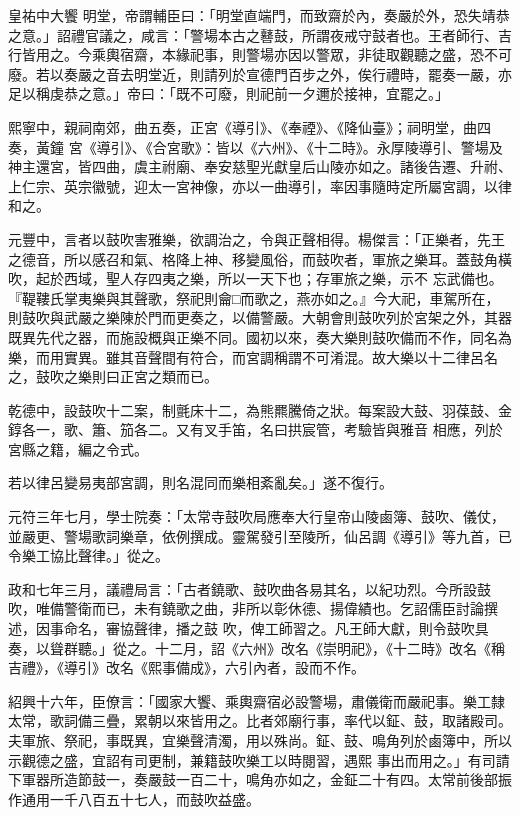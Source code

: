 \begin{pinyinscope}
 皇祐中大饗
 明堂，帝謂輔臣曰：「明堂直端門，而致齋於內，奏嚴於外，恐失靖恭之意。」詔禮官議之，咸言：「警場本古之鼛鼓，所謂夜戒守鼓者也。王者師行、吉行皆用之。今乘輿宿齋，本緣祀事，則警場亦因以警眾，非徒取觀聽之盛，恐不可廢。若以奏嚴之音去明堂近，則請列於宣德門百步之外，俟行禮時，罷奏一嚴，亦足以稱虔恭之意。」帝曰：「既不可廢，則祀前一夕邇於接神，宜罷之。」



 熙寧中，親祠南郊，曲五奏，正宮《導引》、《奉禋》、《降仙臺》；祠明堂，曲四奏，黃鐘
 宮《導引》、《合宮歌》：皆以《六州》、《十二時》。永厚陵導引、警場及神主還宮，皆四曲，虞主祔廟、奉安慈聖光獻皇后山陵亦如之。諸後告遷、升祔、上仁宗、英宗徽號，迎太一宮神像，亦以一曲導引，率因事隨時定所屬宮調，以律和之。



 元豐中，言者以鼓吹害雅樂，欲調治之，令與正聲相得。楊傑言：「正樂者，先王之德音，所以感召和氣、格降上神、移變風俗，而鼓吹者，軍旅之樂耳。蓋鼓角橫吹，起於西域，聖人存四夷之樂，所以一天下也；存軍旅之樂，示不
 忘武備也。『鞮鞻氏掌夷樂與其聲歌，祭祀則龠□而歌之，燕亦如之。』今大祀，車駕所在，則鼓吹與武嚴之樂陳於門而更奏之，以備警嚴。大朝會則鼓吹列於宮架之外，其器既異先代之器，而施設概與正樂不同。國初以來，奏大樂則鼓吹備而不作，同名為樂，而用實異。雖其音聲間有符合，而宮調稱謂不可淆混。故大樂以十二律呂名之，鼓吹之樂則曰正宮之類而已。



 乾德中，設鼓吹十二案，制氈床十二，為熊羆騰倚之狀。每案設大鼓、羽葆鼓、金錞各一，歌、簫、笳各二。又有叉手笛，名曰拱宸管，考驗皆與雅音
 相應，列於宮縣之籍，編之令式。



 若以律呂變易夷部宮調，則名混同而樂相紊亂矣。」遂不復行。



 元符三年七月，學士院奏：「太常寺鼓吹局應奉大行皇帝山陵鹵簿、鼓吹、儀仗，並嚴更、警場歌詞樂章，依例撰成。靈駕發引至陵所，仙呂調《導引》等九首，已令樂工協比聲律。」從之。



 政和七年三月，議禮局言：「古者鐃歌、鼓吹曲各易其名，以紀功烈。今所設鼓吹，唯備警衛而已，未有鐃歌之曲，非所以彰休德、揚偉績也。乞詔儒臣討論撰述，因事命名，審協聲律，播之鼓
 吹，俾工師習之。凡王師大獻，則令鼓吹具奏，以聳群聽。」從之。十二月，詔《六州》改名《崇明祀》，《十二時》改名《稱吉禮》，《導引》改名《熙事備成》，六引內者，設而不作。



 紹興十六年，臣僚言：「國家大饗、乘輿齋宿必設警場，肅儀衛而嚴祀事。樂工隸太常，歌詞備三疊，累朝以來皆用之。比者郊廟行事，率代以鉦、鼓，取諸殿司。夫軍旅、祭祀，事既異，宜樂聲清濁，用以殊尚。鉦、鼓、鳴角列於鹵簿中，所以示觀德之盛，宜詔有司更制，兼籍鼓吹樂工以時閱習，遇熙
 事出而用之。」有司請下軍器所造節鼓一，奏嚴鼓一百二十，鳴角亦如之，金鉦二十有四。太常前後部振作通用一千八百五十七人，而鼓吹益盛。




\end{pinyinscope}
